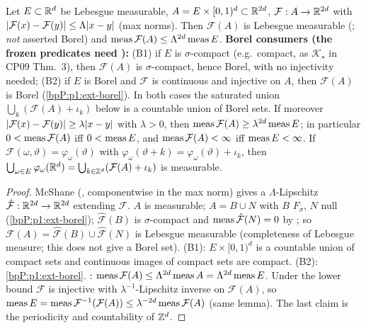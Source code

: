 \begin{lemma}\label{bpP:p1:torus-union}
Let $E\subset\mathbb{R}^d$ be Lebesgue measurable, $A=E\times[0,1)^d\subset\mathbb{R}^{2d}$, $\mathcal F:A\to\mathbb{R}^{2d}$ with $\lvert \mathcal F(x)-\mathcal F(y)\rvert\le\Lambda\lvert x-y\rvert$ (max norms). Then $\mathcal F(A)$ is Lebesgue measurable (; \emph{not} asserted Borel) and $\operatorname{meas}\mathcal F(A)\le\Lambda^{2d}\operatorname{meas} E$. \textbf{Borel consumers (the frozen predicates need ):} (B1) if $E$ is $\sigma$-compact (e.g.\ compact, as $\mathcal K_\star$ in CP09 Thm.~3), then $\mathcal F(A)$ is $\sigma$-compact, hence Borel, with no injectivity needed; (B2) if $E$ is Borel and $\mathcal F$ is continuous and injective on $A$, then $\mathcal F(A)$ is Borel (\ref{bpP:p1:ext-borel}). In both cases the saturated union $\bigcup_k(\mathcal F(A)+\iota_k)$ below is a countable union of Borel sets. If moreover $\lvert \mathcal F(x)-\mathcal F(y)\rvert\ge\lambda\lvert x-y\rvert$ with $\lambda>0$, then $\operatorname{meas}\mathcal F(A)\ge\lambda^{2d}\operatorname{meas} E$; in particular $0<\operatorname{meas}\mathcal F(A)$ iff $0<\operatorname{meas} E$, and $\operatorname{meas}\mathcal F(A)<\infty$ iff $\operatorname{meas} E<\infty$. If $\mathcal F(\omega,\vartheta)=\varphi_\omega(\vartheta)$ with $\varphi_\omega(\vartheta+k)=\varphi_\omega(\vartheta)+\iota_k$, then $\bigcup_{\omega\in E}\varphi_\omega(\mathbb{R}^d)=\bigcup_{k\in\mathbb{Z}^d}(\mathcal F(A)+\iota_k)$ is measurable.
\end{lemma}
\begin{proof}
\label{stepP:p1:tu-ext} McShane (, componentwise in the max norm) gives a $\Lambda$-Lipschitz $\hat{\mathcal F}:\mathbb{R}^{2d}\to\mathbb{R}^{2d}$ extending $\mathcal F$.
\label{stepP:p1:tu-meas} $A$ is measurable; $A=B\cup N$ with $B$ $F_\sigma$, $N$ null (\ref{bpP:p1:ext-borel}); $\hat{\mathcal F}(B)$ is $\sigma$-compact and $\operatorname{meas}\hat{\mathcal F}(N)=0$ by ; so $\mathcal F(A)=\hat{\mathcal F}(B)\cup\hat{\mathcal F}(N)$ is Lebesgue measurable (completeness of Lebesgue measure; this does not give a Borel set).
\label{stepP:p1:tu-borel} (B1): $E\times[0,1)^d$ is a countable union of compact sets and continuous images of compact sets are compact. (B2): \ref{bpP:p1:ext-borel}.
\label{stepP:p1:tu-bounds} : $\operatorname{meas}\mathcal F(A)\le\Lambda^{2d}\operatorname{meas} A=\Lambda^{2d}\operatorname{meas} E$. Under the lower bound $\mathcal F$ is injective with $\lambda^{-1}$-Lipschitz inverse on $\mathcal F(A)$, so $\operatorname{meas} E=\operatorname{meas}\mathcal F^{-1}(\mathcal F(A))\le\lambda^{-2d}\operatorname{meas}\mathcal F(A)$ (same lemma). The last claim is the periodicity and countability of $\mathbb{Z}^d$.
\end{proof}
